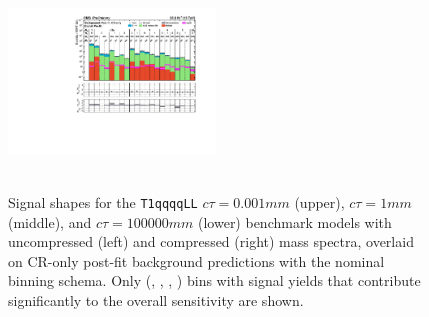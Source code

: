\begin{figure}[!ht]
{        \includegraphics[width=0.49\textwidth]{figures/results/36invfb_nlo_fix/mountainRangePlots/most_sensitive_bins_signal/SMS-T1qqqqLL_ctau_1_mGluino-1000_mLSP-900_25ns/all_full-fit-sig-top_bins_25}
        \label{fig:T1qqqqLL_ctau_1_uncompressed_MR_simp_with_signal}
    } \\
     ~~
     \\
    \caption{ Signal shapes for the \texttt{T1qqqqLL}
      $c\tau=0.001\unit{mm}$ (upper), $c\tau=1\unit{mm}$ (middle), and
      $c\tau=100000\unit{mm}$ (lower) benchmark models with
      uncompressed (left) and compressed (right) mass spectra,
      overlaid on CR-only post-fit background predictions with the
      nominal binning schema. Only (\njet, \nb, \scalht, \mht) bins
      with signal yields that contribute significantly to the overall
      sensitivity are shown.  }
    \label{fig:T1qqqqLL_MR_simp_with_signal}
\end{figure}

